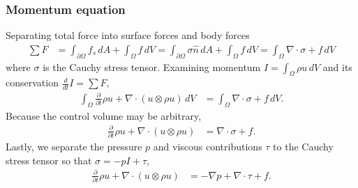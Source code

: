 \documentclass[letterpaper,11pt,nointlimits,reqno]{amsart}
\begin{document}
\subsubsection{Momentum equation}
Separating total force into surface forces and body forces
\begin{align}
  \sum{}F
  &=
     \int_{\partial\Omega} f_s \, dA
   + \int_{\Omega} f \, dV
  =
     \int_{\partial\Omega} \sigma \hat{n} \, dA
  +  \int_{\Omega} f \, dV
  =  \int_{\Omega} \nabla\cdot\sigma + f \, dV
\end{align}
where $\sigma$ is the Cauchy stress tensor.  Examining
momentum $I=\int_{\Omega} \rho{}u\,dV$ and its conservation
$\frac{d}{dt}I=\sum{}F$,
\begin{align}
    \int_{\Omega}\frac{\partial{}}{\partial{}t}\rho{}u
  + \nabla\cdot(u\otimes{}\rho{}u)\,dV
&= \int_{\Omega} \nabla\cdot\sigma + f \, dV
.
\end{align}
Because the control volume may be arbitrary,
\begin{align}
  \frac{\partial{}}{\partial{}t}\rho{}u + \nabla\cdot(u\otimes{}\rho{}u)
&= \nabla\cdot\sigma + f
.
\end{align}
Lastly, we separate the pressure $p$ and viscous contributions $\tau$ to
the Cauchy stress tensor so that $\sigma = -p I + \tau$,
\begin{align}
\label{eq:cons_momentum}
\frac{\partial{}}{\partial{}t}\rho{}u + \nabla\cdot(u\otimes{}\rho{}u)
&= -\nabla{}p + \nabla\cdot{}\tau + f
.
\end{align}
\end{document}
